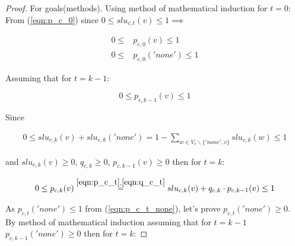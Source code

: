 \documentclass[12pt,titlepage,a4paper]{article}
\begin{document}
\begin{proof}
    For goals(methods).
    Using method of mathematical induction for $t=0$: \\
    From (\ref{eqn:p_c_0}) since $0 \leq slu_{c,t}(v) \leq 1 \implies $

    \begin{equation}
        \begin{aligned}
            0 \leq &p_{c,0}(v) \leq 1 \\
            0 \leq &p_{c, 0}('none') \leq 1
        \end{aligned}
    \end{equation}

    \noindent Assuming that for $t = k-1$:

    \begin{equation}
        0 \leq p_{c,k-1}(v) \leq 1
    \end{equation} 

    \noindent Since

    \begin{equation}
        \begin{aligned}
            0 \leq slu_{c,k}(v) + slu_{c,k}('none') = 1 - \sum_{w \in V_{c} \backslash \{'none', v\}} slu_{c,k}(w) \leq 1
        \end{aligned}
    \end{equation}

    \noindent and $ slu_{c,k}(v) \geq 0 $,  $q_{c,k} \geq 0$, $p_{c,k-1}(v) \geq 0$
    then for $t=k$:

    \begin{equation}
        \begin{aligned}
            0 \leq p_{c, k}(v) \overset{
                \mathrm{\ref{eqn:p_c_t}}, 
                \mathrm{\ref{eqn:q_c_t}}
                }{=} slu_{c,k}(v) + q_{c,k} \cdot p_{c, k-1}(v) \leq 1
        \end{aligned}
    \end{equation}

    \noindent As $p_{c, t}('none') \leq 1$ from (\ref{eqn:p_c_t_none}), let's prove $p_{c, t}('none') \geq 0$.\\
    
    \noindent By method of mathematical induction assuming that for $t = k-1$ $p_{c, k-1}('none') \geq 0$ then for $t = k$:


\end{proof}
\end{document}
